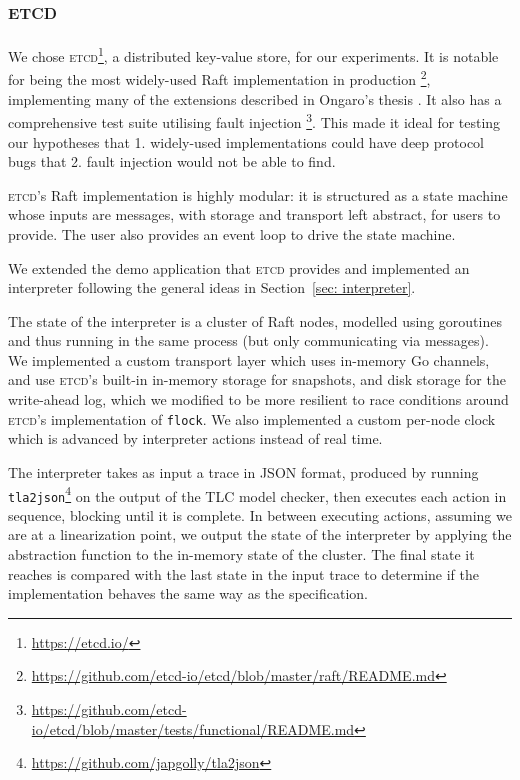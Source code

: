 \documentclass[a4paper]{article}
\newcommand{\tname}[1]{\textsc{#1}\xspace}
\newcommand{\etcd}{\tname{etcd}}
\begin{document}
\subsection{\etcd}

We chose \etcd \footnote{\url{https://etcd.io/}}, a distributed key-value store, for our experiments.
%
It is notable for being the most widely-used Raft implementation in production \footnote{\url{https://github.com/etcd-io/etcd/blob/master/raft/README.md}}, implementing many of the extensions described in Ongaro's thesis \cite{ongaro_consensus_2014}. It also has a comprehensive test suite utilising fault injection \footnote{\url{https://github.com/etcd-io/etcd/blob/master/tests/functional/README.md}}.
%
This made it ideal for testing our hypotheses that 1. widely-used implementations could have deep protocol bugs that 2. fault injection would not be able to find.

\etcd's Raft implementation is highly modular: it is structured as a state machine whose inputs are messages, with storage and transport left abstract, for users to provide.
%
The user also provides an event loop to drive the state machine.

We extended the demo application that \etcd provides and implemented an interpreter following the general ideas in Section~\ref{sec: interpreter}.

The state of the interpreter is a cluster of Raft nodes, modelled using goroutines and thus running in the same process (but only communicating via messages).
%
We implemented a custom transport layer which uses in-memory Go channels, and use \etcd's built-in in-memory storage for snapshots, and disk storage for the write-ahead log, which we modified to be more resilient to race conditions around \etcd's implementation of \texttt{flock}.
%
We also implemented a custom per-node clock which is advanced by interpreter actions instead of real time.

The interpreter takes as input a trace in JSON format, produced by running \texttt{tla2json}\footnote{\url{https://github.com/japgolly/tla2json}} on the output of the TLC model checker, then executes each action in sequence, blocking until it is complete.
%
In between executing actions, assuming we are at a linearization point, we output the state of the interpreter by applying the abstraction function to the in-memory state of the cluster.
%
The final state it reaches is compared with the last state in the input trace to determine if the implementation behaves the same way as the specification.
\end{document}
